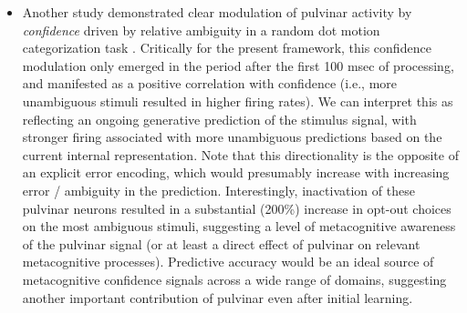 \documentclass[11pt,twoside]{article}
\newif\myifpdf
\begin{document}
\begin{itemize}
	\item Another study demonstrated clear modulation of pulvinar activity by \emph{confidence} driven by relative ambiguity in a random dot motion categorization task \cite{KomuraNikkuniHirashimaEtAl13}.  Critically for the present framework, this confidence modulation only emerged in the period after the first 100 msec of processing, and manifested as a positive correlation with confidence (i.e., more unambiguous stimuli resulted in higher firing rates).  We can interpret this as reflecting an ongoing generative prediction of the stimulus signal, with stronger firing associated with more unambiguous predictions based on the current internal representation.  Note that this directionality is the opposite of an explicit error encoding, which would presumably increase with increasing error / ambiguity in the prediction.  Interestingly, inactivation of these pulvinar neurons resulted in a substantial (200\%) increase in opt-out choices on the most ambiguous stimuli, suggesting a level of metacognitive awareness of the pulvinar signal (or at least a direct effect of pulvinar on relevant metacognitive processes).  Predictive accuracy would be an ideal source of metacognitive confidence signals across a wide range of domains, suggesting another important contribution of pulvinar even after initial learning.

\end{itemize}
\end{document}
